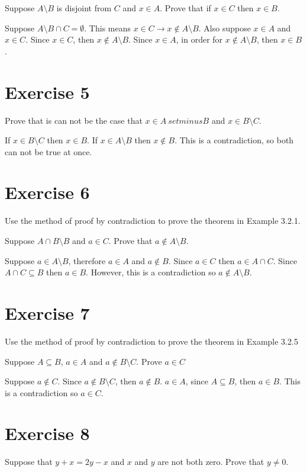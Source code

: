\documentclass[11pt]{article}
\newcommand{\then}{\rightarrow}
\begin{document}
Suppose $A \setminus B$ is disjoint from $C$ and $x \in A$. Prove that if 
$x \in C$ then $x \in B$.

Suppose $A \setminus B \cap C = \emptyset$. This means 
$x \in C \then x \notin A \setminus B$. Also suppose $x \in A$ and $x \in C$.
Since $x \in C$, then $x \notin A \setminus B$. Since $x \in A$, in order for 
$x \notin A \setminus B$, then $x \in B$.

\section*{Exercise 5}

Prove that is can not be the case that $x \in A \ setminus B$ and 
$x \in B \setminus C$.

If $x \in B \setminus C$ then $x \in B$. If $x \in A \setminus B$ then 
$x \notin B$. This is a contradiction, so both can not be true at once.

\section*{Exercise 6}

Use the method of proof by contradiction to prove the theorem in Example 3.2.1.

Suppose $A \cap B \setminus B$ and $a \in C$. Prove that 
$a \notin A \setminus B$.

Suppose $a \in A \setminus B$, therefore $a \in A$ and $a \notin B$. Since 
$a \in C$ then $a \in A \cap C$. Since $A \cap C \subseteq B$ then $a \in B$.
However, this is a contradiction so $a \notin A \setminus B$.

\section*{Exercise 7}

Use the method of proof by contradiction to prove the theorem in Example 3.2.5

Suppose $A \subseteq B$, $a \in A$ and $a \notin B \setminus C$. Prove $a \in C$

Suppose $a \notin C$. Since $a \notin B \setminus C$, then $a \notin B$. 
$a \in A$, since $A \subseteq B$, then $a \in B$. This is a contradiction so 
$a \in C$.

\section*{Exercise 8}

Suppose that $y + x = 2y - x$ and $x$ and $y$ are not both zero. Prove that 
$y \neq 0$.
\end{document}
